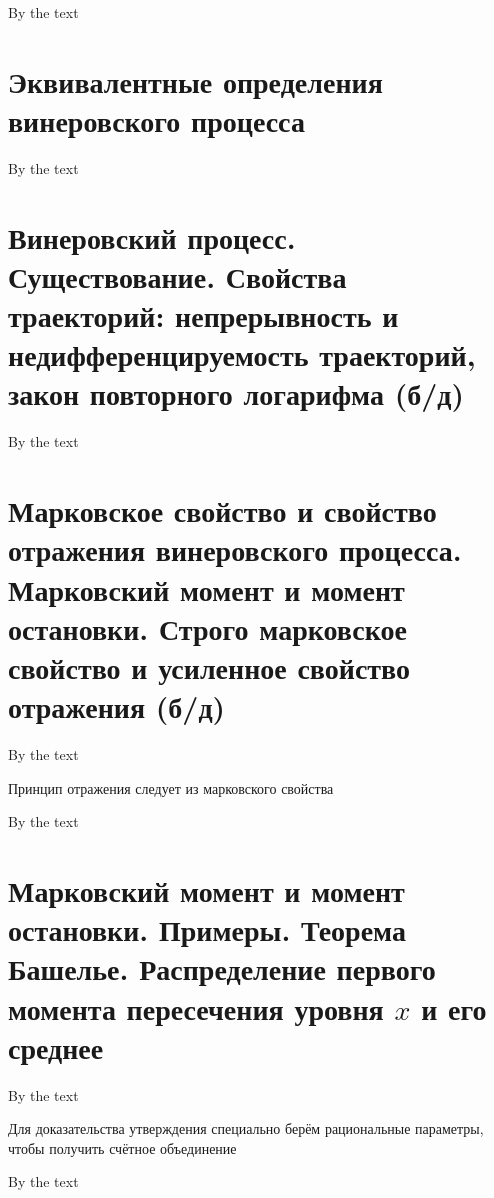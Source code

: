 \documentclass[a4paper, 14pt]{article}
\begin{document}
    By the text
    
    \section{Эквивалентные определения винеровского процесса}
    
    By the text
    
    \section{Винеровский процесс.
    Существование.
    Свойства траекторий: непрерывность и недифференцируемость траекторий, закон повторного логарифма (б/д)}
    
    By the text
    
    \section{Марковское свойство и свойство отражения винеровского процесса.
    Марковский момент и момент остановки.
    Строго марковское свойство и усиленное свойство отражения (б/д)}
    
    By the text
    
    Принцип отражения следует из марковского свойства
    
    By the text
    
    \section{Марковский момент и момент остановки.
    Примеры.
    Теорема Башелье.
    Распределение первого момента пересечения уровня $x$ и его среднее}
    
    By the text
    
    Для доказательства утверждения специально берём рациональные параметры, чтобы получить счётное объединение
    
    By the text
\end{document}
